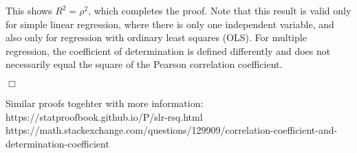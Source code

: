 {%

%
%

This shows $R^2 = \rho^2$, which completes the proof. Note that this result is valid only for simple linear regression, where there is only one independent variable, and also only for regression with ordinary least squares (OLS). For multiple regression, the coefficient of determination is defined differently and does not necessarily equal the square of the Pearson correlation coefficient.

\hfill $\Box$ \\
\vspace*{-0.3cm}

Similar proofs togehter with more information: https://statproofbook.github.io/P/slr-rsq.html
https://math.stackexchange.com/questions/129909/correlation-coefficient-and-determination-coefficient

}
